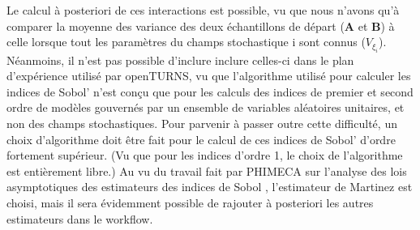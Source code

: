 \documentclass[a4paper,10pt]{article}
\begin{document}
Le calcul à posteriori de ces interactions est possible, vu que nous n'avons qu'à comparer la moyenne des variance des deux échantillons de départ (\textbf{A} et \textbf{B}) à celle lorsque tout les paramètres du champs stochastique i sont connus ($V_{\xi_{i}}$). \\

Néanmoins, il n'est pas possible d'inclure inclure celles-ci dans le plan d’expérience utilisé par openTURNS, vu que l'algorithme utilisé pour calculer les indices de Sobol' n'est conçu que pour les calculs des indices de premier et second ordre de modèles gouvernés par un ensemble de variables aléatoires unitaires, et non des champs stochastiques. Pour parvenir à passer outre cette difficulté, un choix d'algorithme doit être fait pour le calcul de ces indices de Sobol’ d'ordre fortement supérieur. (Vu que pour les indices d'ordre 1, le choix de l'algorithme est entièrement libre.) Au vu du travail fait par PHIMECA sur l'analyse des lois asymptotiques des estimateurs des indices de Sobol \cite{dumas2017} , l'estimateur de Martinez est choisi, mais il sera évidemment possible de rajouter à posteriori les autres estimateurs dans le workflow. \\ 
\end{document}
